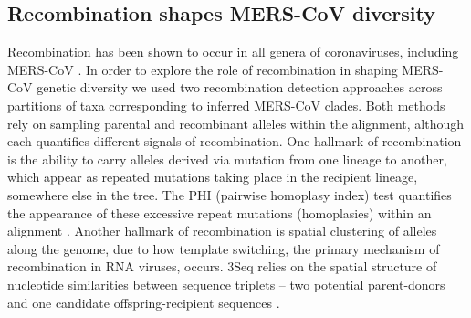 \documentclass[11pt,oneside,letterpaper]{article}
\begin{document}
\subsection*{Recombination shapes MERS-CoV diversity}
Recombination has been shown to occur in all genera of coronaviruses, including MERS-CoV \citep{lai_1985,makino_1986,keck_1988,kottier_1995,herrewegh_1998}.
In order to explore the role of recombination in shaping MERS-CoV genetic diversity we used two recombination detection approaches across partitions of taxa corresponding to inferred MERS-CoV clades.
Both methods rely on sampling parental and recombinant alleles within the alignment, although each quantifies different signals of recombination.
One hallmark of recombination is the ability to carry alleles derived via mutation from one lineage to another, which appear as repeated mutations taking place in the recipient lineage, somewhere else in the tree.
The PHI (pairwise homoplasy index) test quantifies the appearance of these excessive repeat mutations (homoplasies) within an alignment \citep{bruen_simple_2006}.
Another hallmark of recombination is spatial clustering of alleles along the genome, due to how template switching, the primary mechanism of recombination in RNA viruses, occurs.
3Seq relies on the spatial structure of nucleotide similarities between sequence triplets -- two potential parent-donors and one candidate offspring-recipient sequences \citep{boni_exact_2007}.
\end{document}
